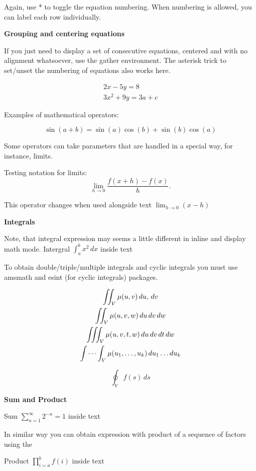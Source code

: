 \documentclass[12pt, letterpaper]{article}
\begin{document}
Again, use * to toggle the equation numbering. When numbering is allowed, you can label each row individually.



\textbf{Grouping and centering equations}

If you just need to display a set of consecutive equations, centered and with no alignment whatsoever, use the gather environment. The asterisk trick to set/unset the numbering of equations also works here.

\begin{gather*} 
2x - 5y =  8 \\ 
3x^2 + 9y =  3a + c
\end{gather*}


Examples of mathematical operators:

\[
      \sin(a+b) =\sin(a)\cos(b) +\sin(b)\cos(a)
\]

Some operators can take parameters that are handled in a special way, for instance, limits.

Testing notation for limits:
\[
    \lim_{h \to 0 } \frac{f(x+h)-f(x)}{h}
.\]

This operator changes when used alongside 
text \(\lim_{h \to 0} \left( x-h \right)\)


\newpage
\textbf{Integrals}

Note, that integral expression may seems a little different in inline and display math mode.
Intergral \(\int_{a}^{b} x^2\, dx \) inside text

To obtain double/triple/multiple integrals and cyclic integrals you must use amsmath and esint (for cyclic integrals) packages.



\begin{gather}
    \iint_V \mu(u,v) \,du,\,dv
\\
    \iint_V \mu(u,v,w) \,du\,dv \,dw
\\
    \iiint_V \mu(u,v,t,w) \,du \, dv\,dt\,dw
\\
    \idotsint_V \mu(u_1,\dots,u_k) \,du_1 \dots du_k
\end{gather}

\[
    \oint_V f(s) \,ds
\]


\textbf{Sum and Product}

Sum  \(\sum_{n=1}^{\infty} 2^{-n}=1\) inside text

\medskip
In similar way you can obtain expression with product of a sequence of factors using the 

Product \(\prod_{i=a}^{b} f(i)\) inside text
\end{document}

